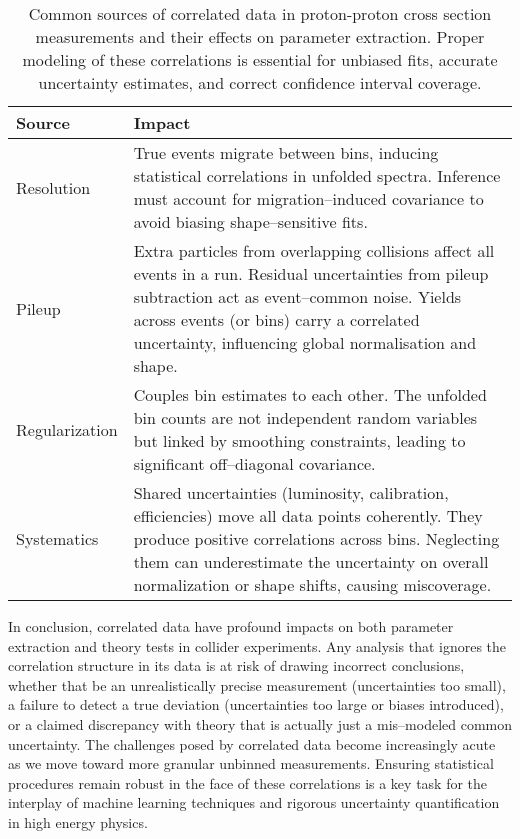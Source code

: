     \begin{table}
        \centering
        \caption[Sources of correlated uncertainties in $pp$ cross section measurements]{Common sources of correlated data in proton-proton cross section measurements and their effects on parameter extraction. Proper modeling of these correlations is essential for unbiased fits, accurate uncertainty estimates, and correct confidence interval coverage.}
        \label{tab:correlations}
        \begin{tabular}{m{0.2\linewidth} m{0.8\linewidth}}
            \toprule
            \textbf{Source} & \textbf{Impact}\\
            \midrule
            Resolution & True events migrate between bins, inducing statistical correlations in unfolded spectra.
                Inference must account for migration--induced covariance to avoid biasing shape--sensitive fits.\\
            \hline
            Pileup & Extra particles from overlapping collisions affect all events in a run.
            Residual uncertainties from pileup subtraction act as event--common noise.
            Yields across events (or bins) carry a correlated uncertainty, influencing global normalisation and shape.\\
            \hline
            Regularization & Couples bin estimates to each other.
            The unfolded bin counts are not independent random variables but linked by smoothing constraints, leading to significant off--diagonal covariance.\\
            \hline
            Systematics & Shared uncertainties (luminosity, calibration, efficiencies) move all data points coherently.
            They produce positive correlations across bins. Neglecting them can underestimate the uncertainty on overall normalization or shape shifts, causing miscoverage.\\
        \bottomrule
        \end{tabular}
    \end{table}
    In conclusion, correlated data have profound impacts on both parameter extraction and theory tests in collider experiments.
    Any analysis that ignores the correlation structure in its data is at risk of drawing incorrect conclusions, whether that be an unrealistically precise measurement (uncertainties too small), a failure to detect a true deviation (uncertainties too large or biases introduced), or a claimed discrepancy with theory that is actually just a mis--modeled common uncertainty.
    The challenges posed by correlated data become increasingly acute as we move toward more granular unbinned measurements.
    Ensuring statistical procedures remain robust in the face of these correlations is a key task for the interplay of machine learning techniques and rigorous uncertainty quantification in high energy physics.
